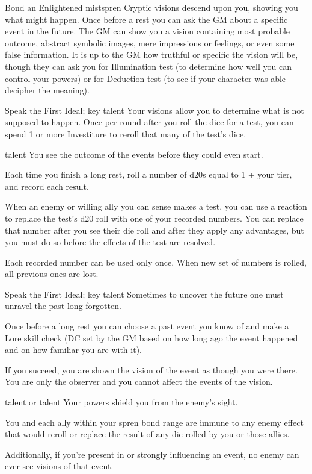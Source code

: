 		{Bond an Enlightened mistspren}
		{\iconSpecial}
		{Cryptic visions descend upon you, showing you what might happen.}
		{Once before a rest you can ask the GM about a specific event in the future. The GM can show you a vision containing most probable outcome, abstract symbolic images, mere impressions or feelings, or even some false information. It is up to the GM how truthful or specific the vision will be, though they can ask you for Illumination test (to determine how well you can control your powers) or for Deduction test (to see if your character was able decipher the meaning).}

\newpage		
\talent{\talentTruthwatcherGlimpseFutureName}
		{Speak the First Ideal; \talentTruthwatcherFutureSightName key talent}
		{\iconSpecial}
		{Your visions allow you to determine what is not supposed to happen.}
		{Once per round after you roll the dice for a test, you can spend 1 or more Investiture to reroll that many of the test’s dice.}

\talent{\talentTruthwatcherAlterFortuneName}
		{\talentTruthwatcherGlimpseFutureName{} talent}
		{\iconReaction}
		{You see the outcome of the events before they could even start.}
		{Each time you finish a long rest, roll a number of d20s equal to 1 + your tier, and record each result.

		When an enemy or willing ally you can sense makes a test, you can use a reaction to replace the test’s d20 roll with one of your recorded numbers. You can replace that number after you see their die roll and after they apply any advantages, but you must do so before the effects of the test are resolved.

		Each recorded number can be used only once. When new set of numbers is rolled, all previous ones are lost.}
		
\talent{\talentTruthwatcherSearchPastName}
		{Speak the First Ideal; \talentTruthwatcherFutureSightName key talent}
		{\iconSpecial}
		{Sometimes to uncover the future one must unravel the past long forgotten.}
		{Once before a long rest you can choose a past event you know of and make a Lore skill check (DC set by the GM based on how long ago the event happened and on how familiar you are with it).

		If you succeed, you are shown the vision of the event as though you were there. You are only the observer and you cannot affect the events of the vision.}
		
\talent{\talentTruthwatcherVisionVoidName}
		{\talentTruthwatcherGlimpseFutureName{} talent or \talentTruthwatcherSearchPastName{} talent}
		{\iconConstant}
		{Your powers shield you from the enemy's sight.}
		{You and each ally within your spren bond range are immune to any enemy effect that would reroll or replace the result of any die rolled by you or those allies.

		Additionally, if you’re present in or strongly influencing an event, no enemy can ever see visions of that event.}
		

